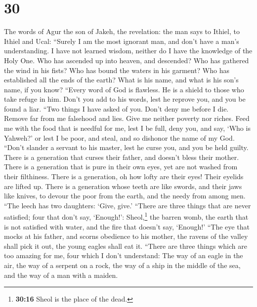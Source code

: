 \hypertarget{section-25}{%
\section{30}\label{section-25}}

 The words of Agur the son of Jakeh, the revelation: the
man says to Ithiel, to Ithiel and Ucal:  ``Surely I am the
most ignorant man, and don't have a man's understanding. 
I have not learned wisdom, neither do I have the knowledge of the Holy
One.  Who has ascended up into heaven, and descended? Who
has gathered the wind in his fists? Who has bound the waters in his
garment? Who has established all the ends of the earth? What is his
name, and what is his son's name, if you know?  ``Every
word of God is flawless. He is a shield to those who take refuge in him.
 Don't you add to his words, lest he reprove you, and you
be found a liar.  ``Two things I have asked of you. Don't
deny me before I die.  Remove far from me falsehood and
lies. Give me neither poverty nor riches. Feed me with the food that is
needful for me,  lest I be full, deny you, and say, `Who
is Yahweh?' or lest I be poor, and steal, and so dishonor the name of my
God.  ``Don't slander a servant to his master, lest he
curse you, and you be held guilty.  There is a generation
that curses their father, and doesn't bless their mother.
 There is a generation that is pure in their own eyes,
yet are not washed from their filthiness.  There is a
generation, oh how lofty are their eyes! Their eyelids are lifted up.
 There is a generation whose teeth are like swords, and
their jaws like knives, to devour the poor from the earth, and the needy
from among men.  ``The leech has two daughters: `Give,
give.' ``There are three things that are never satisfied; four that
don't say, `Enough!':  Sheol,\footnote{\textbf{30:16}
  Sheol is the place of the dead.} the barren womb, the earth that is
not satisfied with water, and the fire that doesn't say, `Enough!'
 ``The eye that mocks at his father, and scorns obedience
to his mother, the ravens of the valley shall pick it out, the young
eagles shall eat it.  ``There are three things which are
too amazing for me, four which I don't understand:  The
way of an eagle in the air, the way of a serpent on a rock, the way of a
ship in the middle of the sea, and the way of a man with a maiden.
